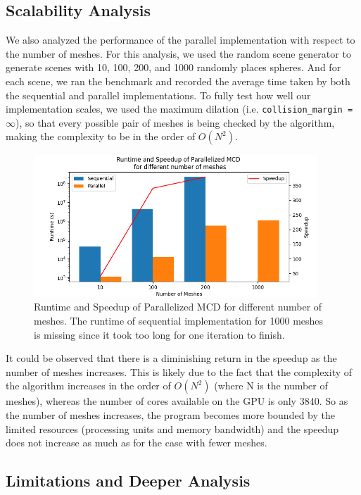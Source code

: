 \documentclass[12pt,fleqn]{article}
\newcommand{\code}[1]{\texttt{#1}}
\begin{document}
\subsection{Scalability Analysis}
We also analyzed the performance of the parallel implementation with respect to the number of meshes.
For this analysis, we used the random scene generator to generate scenes with 10, 100, 200, and 1000 randomly places spheres.
And for each scene, we ran the benchmark and recorded the average time taken by both the sequential and parallel implementations.
To fully test how well our implementation scales, we used the maximum dilation (i.e. \code{collision\_margin = $\infty$}), so that every possible pair of meshes is being checked by the algorithm, making the complexity to be in the order of $O(N^2)$.
\begin{figure}[ht!]
    \centering
    \includegraphics[width=0.95\textwidth]{figs/scalibility_approaches.png}
    \caption{%
        Runtime and Speedup of Parallelized MCD for different number of meshes.
        The runtime of sequential implementation for 1000 meshes is missing since it took too long for one iteration to finish.}
    \label{fig:scalibility_approaches}
\end{figure}

It could be observed that there is a diminishing return in the speedup as the number of meshes increases.
This is likely due to the fact that the complexity of the algorithm increases in the order of $O(N^2)$ (where N is the number of meshes), whereas the number of cores available on the GPU is only 3840.
So as the number of meshes increases, the program becomes more bounded by the limited resources (processing units and memory bandwidth) and the speedup does not increase as much as for the case with fewer meshes.

\subsection{Limitations and Deeper Analysis}
\end{document}
